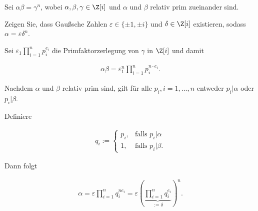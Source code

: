 
\begin{exercise}

Sei $\alpha \beta = \gamma^n$, wobei $\alpha, \beta, \gamma \in \Z[i]$
und $\alpha$ und $\beta$ relativ prim zueinander sind.

Zeigen Sie, dass Gaußsche Zahlen $\varepsilon \in \{\pm 1, \pm i\}$ und
$\delta \in \Z[i]$ existieren, sodass $\alpha = \varepsilon \delta^n$.

\end{exercise}


\begin{solution}

Sei $\varepsilon_1 \prod_{i=1}^n p_i^{e_i}$ die Primfaktorzerlegung 
von $\gamma$ in $\Z[i]$ und damit

\begin{align*}
    \alpha \beta = \varepsilon_1^n \prod_{i=1}^n p_i^{n \cdot e_i}.
\end{align*}

Nachdem $\alpha$ und $\beta$ relativ prim sind, gilt für alle $p_i, i = 1,\dots,n$
entweder $p_i | \alpha$ oder $p_i | \beta$. 

Definiere 

\begin{align*}
    q_i := \begin{cases}
        p_i, & \text{falls } p_i | \alpha \\
        1, & \text{falls } p_i | \beta.
    \end{cases}
\end{align*}

Dann folgt 

\begin{align*}
    \alpha = \varepsilon \prod_{i=1}^n q_i^{n e_i}
    = \varepsilon \left(\underbrace{\prod_{i=1}^n q_i^{e_i}}_{:=\delta}\right)^n.
\end{align*}


\end{solution}

